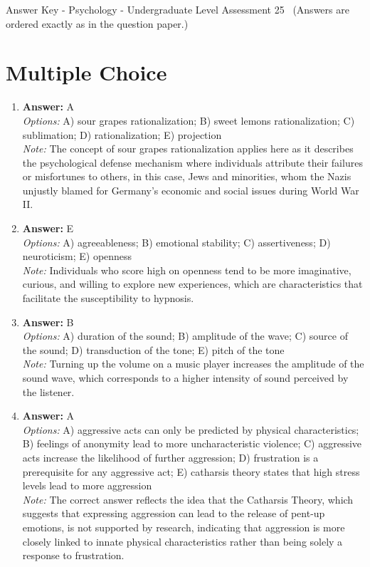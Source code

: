 \documentclass[12pt]{article}
\begin{document}
\begin{center}
Answer Key - Psychology - Undergraduate Level Assessment 25 \
\small (Answers are ordered exactly as in the question paper.)
\end{center}

\section*{Multiple Choice}
\begin{enumerate}[label=\arabic*.]
\item \textbf{Answer:} A
\\ \textit{Options:} A) sour grapes rationalization; B) sweet lemons rationalization; C) sublimation; D) rationalization; E) projection
\\ \textit{Note:} The concept of sour grapes rationalization applies here as it describes the psychological defense mechanism where individuals attribute their failures or misfortunes to others, in this case, Jews and minorities, whom the Nazis unjustly blamed for Germany's economic and social issues during World War II.
\item \textbf{Answer:} E
\\ \textit{Options:} A) agreeableness; B) emotional stability; C) assertiveness; D) neuroticism; E) openness
\\ \textit{Note:} Individuals who score high on openness tend to be more imaginative, curious, and willing to explore new experiences, which are characteristics that facilitate the susceptibility to hypnosis.
\item \textbf{Answer:} B
\\ \textit{Options:} A) duration of the sound; B) amplitude of the wave; C) source of the sound; D) transduction of the tone; E) pitch of the tone
\\ \textit{Note:} Turning up the volume on a music player increases the amplitude of the sound wave, which corresponds to a higher intensity of sound perceived by the listener.
\item \textbf{Answer:} A
\\ \textit{Options:} A) aggressive acts can only be predicted by physical characteristics; B) feelings of anonymity lead to more uncharacteristic violence; C) aggressive acts increase the likelihood of further aggression; D) frustration is a prerequisite for any aggressive act; E) catharsis theory states that high stress levels lead to more aggression
\\ \textit{Note:} The correct answer reflects the idea that the Catharsis Theory, which suggests that expressing aggression can lead to the release of pent-up emotions, is not supported by research, indicating that aggression is more closely linked to innate physical characteristics rather than being solely a response to frustration.

\end{enumerate}
\end{document}
